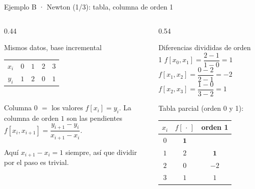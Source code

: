 \documentclass[aspectratio=169,10pt]{beamer}
\begin{document}
\begin{frame}{Ejemplo B · Newton (1/3): tabla, columna de orden 1}
\begin{columns}[T]
\begin{column}{0.44\textwidth}
\begin{cardidea}{Mismos datos, base incremental}{\faListOl}
{\footnotesize
\centering
\renewcommand{\arraystretch}{1.18}\setlength{\tabcolsep}{8pt}
\begin{tabular}{c|cccc}
$x_i$ & $0$ & $1$ & $2$ & $3$\\
$y_i$ & $1$ & $2$ & $0$ & $1$\\
\end{tabular}}\\[1.2mm]
{\footnotesize Columna $0$ $=$ los valores $f[x_i]=y_i$. La columna de orden $1$ son las pendientes\\[0.4mm]
$f[x_i,x_{i+1}]=\dfrac{y_{i+1}-y_i}{x_{i+1}-x_i}$.}
\end{cardidea}
\vspace{1mm}
\begin{cardnota}[\faInfoCircle]
{\footnotesize Aquí $x_{i+1}-x_i=1$ siempre, así que dividir por el paso es trivial.}
\end{cardnota}
\end{column}
\begin{column}{0.54\textwidth}
\begin{cardgear}{Diferencias divididas de orden 1}{\faCalculator}
{\footnotesize
$f[x_0,x_1]=\dfrac{2-1}{1-0}=1$\\[1.0mm]
$f[x_1,x_2]=\dfrac{0-2}{2-1}=-2$\\[1.0mm]
$f[x_2,x_3]=\dfrac{1-0}{3-2}=1$}
\end{cardgear}
\vspace{1mm}
\begin{cardnota}[\faTable]
\centering
{\footnotesize Tabla parcial (orden 0 y 1):\\[0.6mm]
\renewcommand{\arraystretch}{1.2}\setlength{\tabcolsep}{7pt}
\begin{tabular}{c|c|c}
$x_i$ & $f[\,\cdot\,]$ & orden 1\\\hline
$0$ & $\mathbf 1$ & \\
$1$ & $2$ & $\mathbf 1$\\
$2$ & $0$ & $-2$\\
$3$ & $1$ & $1$\\
\end{tabular}}
\end{cardnota}
\end{column}
\end{columns}
\end{frame}
\end{document}
